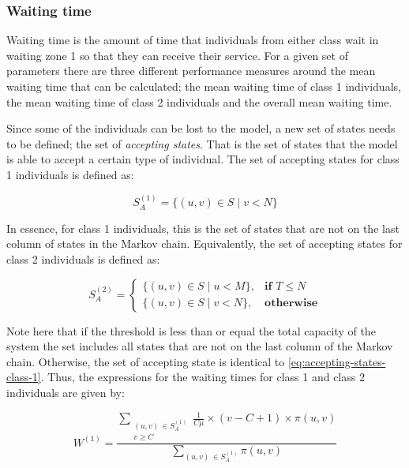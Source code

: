 \subsubsection{Waiting time} \label{sec:waiting-time}

Waiting time is the amount of time that individuals from either class wait in 
waiting zone 1 so that they can receive their service. 
For a given set of parameters there are three different performance measures 
around the mean waiting time that can be calculated; the mean waiting time of
class 1 individuals, the mean waiting time of class 2 individuals and the 
overall mean waiting time. 

Since some of the individuals can be lost to the model, a new set of states 
needs to be defined; the set of \textit{accepting states}. 
That is the set of states that the model is able to accept a certain type of
individual. 
The set of accepting states for class 1 individuals is defined as:

\begin{equation}\label{eq:accepting-states-class-1}
    S_A^{(1)} = \{(u, v) \in S \; | \; v < N \}
\end{equation}

In essence, for class 1 individuals, this is the set of states that are not on 
the last column of states in the Markov chain.
Equivalently, the set of accepting states for class 2 individuals is defined as:

\begin{equation}\label{eq:accepting-states-class-2}
    S_A^{(2)}=
    \begin{cases}
        \{(u, v) \in S \; | \; u < M \}, & \textbf{if } T \leq N\\
        \{(u, v) \in S \; | \; v < N \}, & \textbf{otherwise}
    \end{cases}
\end{equation}

Note here that if the threshold is less than or equal the total capacity of the
system the set includes all states that are not on the last column of the 
Markov chain.
Otherwise, the set of accepting state is identical to 
\ref{eq:accepting-states-class-1}. Thus, the expressions for the waiting times 
for class 1 and class 2 individuals are given by:

\begin{equation} \label{eq:closed-form-waiting-class-1}
    W^{(1)} = \frac{\sum_{\substack{(u,v) \, \in S_A^{(1)} \\ v \geq C}} 
    \frac{1}{C \mu} \times (v-C+1) \times \pi(u,v)}{\sum_{(u,v) \, 
    \in S_A^{(1)}} \pi(u,v)}
\end{equation}
    
